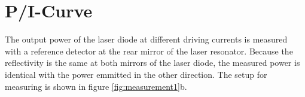 \section{P/I-Curve}
The output power of the laser diode at different driving currents is measured with a reference detector at the rear mirror of the laser resonator. Because the reflectivity is the same at both mirrors of the laser diode, the measured power is identical with the power emmitted in the other direction. The setup for measuring is shown in figure \ref{fig:measurement1}b.

